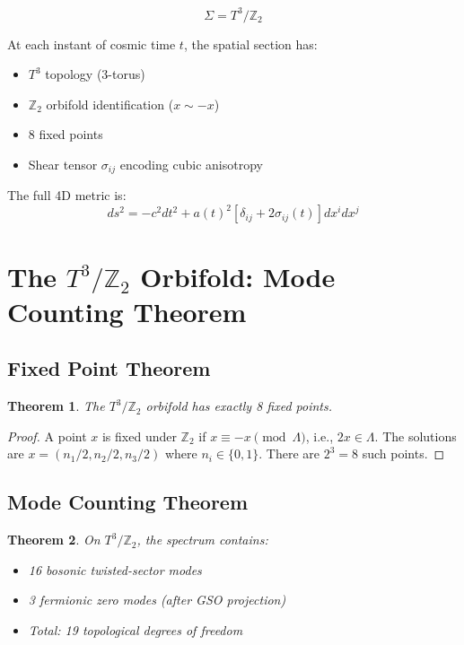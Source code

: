 \documentclass[12pt,a4paper]{article}
\newtheorem{theorem}{Theorem}[section]
\newcommand{\Ztwo}{\mathbb{Z}_2}
\newcommand{\Tthree}{T^3}
\begin{document}
\begin{equation}
\Sigma = \Tthree/\Ztwo
\end{equation}

At each instant of cosmic time $t$, the spatial section has:
\begin{itemize}
    \item $\Tthree$ topology (3-torus)
    \item $\Ztwo$ orbifold identification ($x \sim -x$)
    \item 8 fixed points
    \item Shear tensor $\sigma_{ij}$ encoding cubic anisotropy
\end{itemize}

The full 4D metric is:
\begin{equation}
\boxed{ds^2 = -c^2 dt^2 + a(t)^2 \left[ \delta_{ij} + 2\sigma_{ij}(t) \right] dx^i dx^j}
\end{equation}

\section{The $\Tthree/\Ztwo$ Orbifold: Mode Counting Theorem}
\label{sec:orbifold}

\subsection{Fixed Point Theorem}

\begin{theorem}
The $\Tthree/\Ztwo$ orbifold has exactly 8 fixed points.
\end{theorem}

\begin{proof}
A point $x$ is fixed under $\Ztwo$ if $x \equiv -x \pmod{\Lambda}$, i.e., $2x \in \Lambda$. The solutions are $x = (n_1/2, n_2/2, n_3/2)$ where $n_i \in \{0,1\}$. There are $2^3 = 8$ such points.
\end{proof}

\subsection{Mode Counting Theorem}

\begin{theorem}
On $\Tthree/\Ztwo$, the spectrum contains:
\begin{itemize}
    \item 16 bosonic twisted-sector modes
    \item 3 fermionic zero modes (after GSO projection)
    \item Total: 19 topological degrees of freedom
\end{itemize}
\end{theorem}
\end{document}
